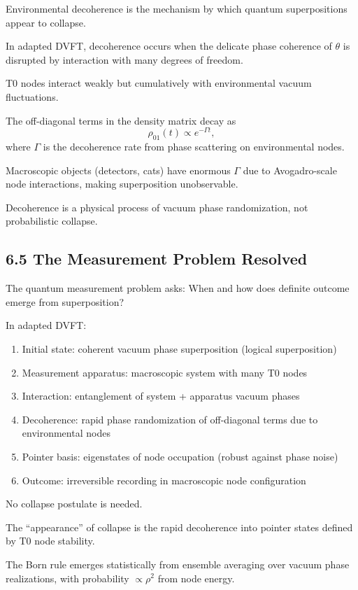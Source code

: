 \documentclass[12pt,a4paper]{article}
\begin{document}
	Environmental decoherence is the mechanism by which quantum superpositions appear to collapse.
	
	In adapted DVFT, decoherence occurs when the delicate phase coherence of $\theta$ is disrupted by interaction with many degrees of freedom.
	
	T0 nodes interact weakly but cumulatively with environmental vacuum fluctuations.
	
	The off-diagonal terms in the density matrix decay as
	\[
	\rho_{01}(t) \propto e^{-\Gamma t},
	\]
	where $\Gamma$ is the decoherence rate from phase scattering on environmental nodes.
	
	Macroscopic objects (detectors, cats) have enormous $\Gamma$ due to Avogadro-scale node interactions, making superposition unobservable.
	
	Decoherence is a physical process of vacuum phase randomization, not probabilistic collapse.
	
	\subsection{6.5 The Measurement Problem Resolved}
	
	The quantum measurement problem asks: When and how does definite outcome emerge from superposition?
	
	In adapted DVFT:
	\begin{enumerate}
		\item Initial state: coherent vacuum phase superposition (logical superposition)
		\item Measurement apparatus: macroscopic system with many T0 nodes
		\item Interaction: entanglement of system + apparatus vacuum phases
		\item Decoherence: rapid phase randomization of off-diagonal terms due to environmental nodes
		\item Pointer basis: eigenstates of node occupation (robust against phase noise)
		\item Outcome: irreversible recording in macroscopic node configuration
	\end{enumerate}
	
	No collapse postulate is needed.
	
	The ``appearance'' of collapse is the rapid decoherence into pointer states defined by T0 node stability.
	
	The Born rule emerges statistically from ensemble averaging over vacuum phase realizations, with probability $\propto \rho^2$ from node energy.
	
\end{document}
